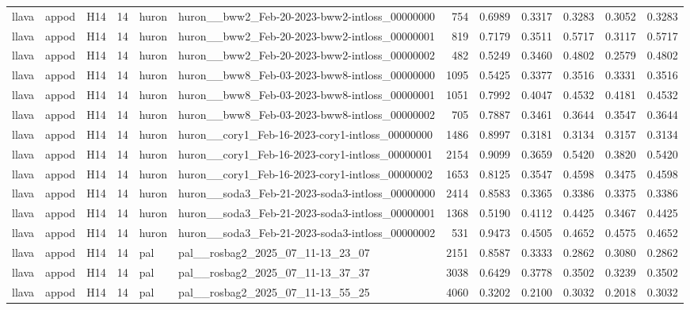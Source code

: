 \begin{table}[tbp]
\begin{tabular}{lllrllrrrrrr}
llava & appod & H14 & 14 & huron & huron\_\_bww2\_Feb-20-2023-bww2-intloss\_00000000 & 754 & 0.6989 & 0.3317 & 0.3283 & 0.3052 & 0.3283 \\
llava & appod & H14 & 14 & huron & huron\_\_bww2\_Feb-20-2023-bww2-intloss\_00000001 & 819 & 0.7179 & 0.3511 & 0.5717 & 0.3117 & 0.5717 \\
llava & appod & H14 & 14 & huron & huron\_\_bww2\_Feb-20-2023-bww2-intloss\_00000002 & 482 & 0.5249 & 0.3460 & 0.4802 & 0.2579 & 0.4802 \\
llava & appod & H14 & 14 & huron & huron\_\_bww8\_Feb-03-2023-bww8-intloss\_00000000 & 1095 & 0.5425 & 0.3377 & 0.3516 & 0.3331 & 0.3516 \\
llava & appod & H14 & 14 & huron & huron\_\_bww8\_Feb-03-2023-bww8-intloss\_00000001 & 1051 & 0.7992 & 0.4047 & 0.4532 & 0.4181 & 0.4532 \\
llava & appod & H14 & 14 & huron & huron\_\_bww8\_Feb-03-2023-bww8-intloss\_00000002 & 705 & 0.7887 & 0.3461 & 0.3644 & 0.3547 & 0.3644 \\
llava & appod & H14 & 14 & huron & huron\_\_cory1\_Feb-16-2023-cory1-intloss\_00000000 & 1486 & 0.8997 & 0.3181 & 0.3134 & 0.3157 & 0.3134 \\
llava & appod & H14 & 14 & huron & huron\_\_cory1\_Feb-16-2023-cory1-intloss\_00000001 & 2154 & 0.9099 & 0.3659 & 0.5420 & 0.3820 & 0.5420 \\
llava & appod & H14 & 14 & huron & huron\_\_cory1\_Feb-16-2023-cory1-intloss\_00000002 & 1653 & 0.8125 & 0.3547 & 0.4598 & 0.3475 & 0.4598 \\
llava & appod & H14 & 14 & huron & huron\_\_soda3\_Feb-21-2023-soda3-intloss\_00000000 & 2414 & 0.8583 & 0.3365 & 0.3386 & 0.3375 & 0.3386 \\
llava & appod & H14 & 14 & huron & huron\_\_soda3\_Feb-21-2023-soda3-intloss\_00000001 & 1368 & 0.5190 & 0.4112 & 0.4425 & 0.3467 & 0.4425 \\
llava & appod & H14 & 14 & huron & huron\_\_soda3\_Feb-21-2023-soda3-intloss\_00000002 & 531 & 0.9473 & 0.4505 & 0.4652 & 0.4575 & 0.4652 \\
llava & appod & H14 & 14 & pal & pal\_\_rosbag2\_2025\_07\_11-13\_23\_07 & 2151 & 0.8587 & 0.3333 & 0.2862 & 0.3080 & 0.2862 \\
llava & appod & H14 & 14 & pal & pal\_\_rosbag2\_2025\_07\_11-13\_37\_37 & 3038 & 0.6429 & 0.3778 & 0.3502 & 0.3239 & 0.3502 \\
llava & appod & H14 & 14 & pal & pal\_\_rosbag2\_2025\_07\_11-13\_55\_25 & 4060 & 0.3202 & 0.2100 & 0.3032 & 0.2018 & 0.3032 \\

\end{tabular}
\end{table}
